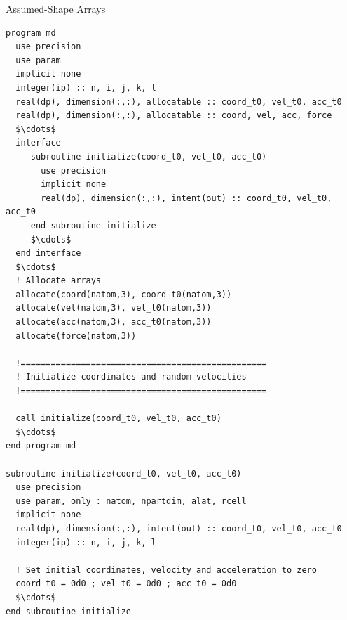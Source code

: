 \documentclass[10pt,t]{beamer}
\begin{document}
\begin{frame}[fragile]{Assumed-Shape Arrays}
  \begin{lstlisting}[language={[90]Fortran},basicstyle=\fontsize{4}{5}\selectfont\ttfamily,mathescape]
program md
  use precision
  use param
  implicit none
  integer(ip) :: n, i, j, k, l
  real(dp), dimension(:,:), allocatable :: coord_t0, vel_t0, acc_t0
  real(dp), dimension(:,:), allocatable :: coord, vel, acc, force
  $\cdots$
  interface
     subroutine initialize(coord_t0, vel_t0, acc_t0)
       use precision
       implicit none
       real(dp), dimension(:,:), intent(out) :: coord_t0, vel_t0, acc_t0
     end subroutine initialize
     $\cdots$
  end interface
  $\cdots$
  ! Allocate arrays
  allocate(coord(natom,3), coord_t0(natom,3))
  allocate(vel(natom,3), vel_t0(natom,3))
  allocate(acc(natom,3), acc_t0(natom,3))
  allocate(force(natom,3))

  !=================================================
  ! Initialize coordinates and random velocities
  !=================================================

  call initialize(coord_t0, vel_t0, acc_t0)
  $\cdots$
end program md

subroutine initialize(coord_t0, vel_t0, acc_t0)
  use precision
  use param, only : natom, npartdim, alat, rcell
  implicit none
  real(dp), dimension(:,:), intent(out) :: coord_t0, vel_t0, acc_t0
  integer(ip) :: n, i, j, k, l

  ! Set initial coordinates, velocity and acceleration to zero
  coord_t0 = 0d0 ; vel_t0 = 0d0 ; acc_t0 = 0d0
  $\cdots$
end subroutine initialize
  \end{lstlisting}
\end{frame}
\end{document}
